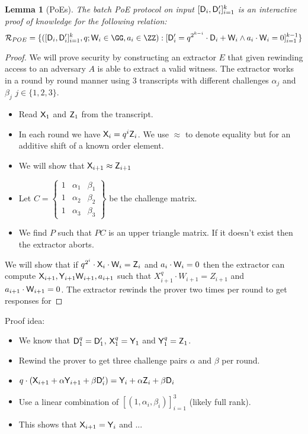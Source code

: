 \documentclass[12pt]{article}
\theoremstyle{Definition}
\newtheorem{lemma}{Lemma}
\begin{document}
	\begin{lemma}[PoEs]
		The batch PoE protocol on input $[\mathsf{D}_i,\mathsf{D}_i']_{i=1}^{k}$ is an interactive proof of knowledge for the following relation:
		$$\mathcal{R}_{POE}=\{([\gr{D}_i,\gr{D}_i']_{i=1}^{\numrounds},q;\gr{W}_i\in \GG,a_i\in \ZZ): [\gr{D}_i'=q^{2^{\numrounds-i}}  \cdot \gr{D}_i+\gr{W}_i \wedge a_i\cdot \gr{W}_i=0]_{i=1}^{\numrounds-1} \}$$
	\end{lemma}
	\begin{proof}
	We will prove security by constructing an extractor $E$ that given rewinding access to an adversary $A$ is able to extract a valid witness. 
The extractor works in a round by round manner using $3$ transcripts with different challenges $\alpha_j$ and $\beta_j$ $j\in\{1,2,3\}$. 
 
\begin{itemize}
	\item Read $\mathsf{X}_1$ and $\mathsf{Z}_1$ from the transcript.
	\item In each round we have $\mathsf{X}_i = q^i \mathsf{Z}_i$. We use $\approx$ to denote equality but for an additive shift of a known order element.
	\item We will show that $\mathsf{X}_{i+1}\approx \mathsf{Z}_{i+1}$
	\item Let $C= \left\{\begin{array}{lll}
		1 & \alpha_1 & \beta_1\\
		1 & \alpha_2 & \beta_2\\
		1 & \alpha_3 & \beta_3
	\end{array}\right\} $ be the challenge matrix. 
	\item We find $P$ such that $P C$ is an upper triangle matrix. If it doesn't exist then the extractor aborts.
\end{itemize}
	We will show that if $q^{2^i}\cdot \mathsf{X}_i \cdot \mathsf{W}_i=\mathsf{Z}_i$ and $a_i \cdot \mathsf{W}_i=0$ then the extractor can compute $\mathsf{X}_{i+1},\mathsf{Y}_{i+1} \mathsf{W}_{i+1}, a_{i+1}$ such that $X_{i+1}^q\cdot W_{i+1}=Z_{i+1}$ and $a_{i+1}\cdot \mathsf{W}_{i+1}=0$.  
	The extractor rewinds the prover two times per round to get responses for  
	\end{proof}
	
	Proof idea:
	\begin{itemize}
		\item  We know that $\mathsf{D}_1^q=\mathsf{D}_1'$, $\mathsf{X}_1^q=\mathsf{Y}_1$ and $\mathsf{Y}_1^q=\mathsf{Z}_1$.
		\item Rewind the prover to get three challenge pairs $\alpha$ and $\beta$ per round.
		\item $q\cdot (\mathsf{X}_{i+1} +\alpha \mathsf{Y}_{i+1} +\beta \mathsf{D}_{i}')= \mathsf{Y}_{i} +\alpha \mathsf{Z}_{i} +\beta \mathsf{D}_{i}$
		\item Use a linear combination of $[(1,\alpha_i,\beta_i)]_{i=1}^3$ (likely full rank). 
		\item This shows that $\mathsf{X}_{i+1}= \mathsf{Y}_{i}$ and ...
	\end{itemize}
\end{document}
